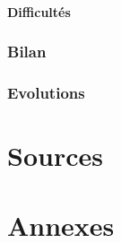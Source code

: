 \documentclass{article}
\begin{document}
    \subsection{Difficultés}

    \newpage


    \section{Bilan}

    \newpage


    \section{Evolutions}

    \newpage


    \part*{Sources}

    \newpage


    \part*{Annexes}

    \newpage


    
\end{document}
